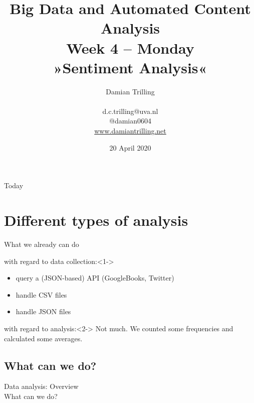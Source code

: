 \documentclass{beamer}
\begin{document}
\title[Big Data and Automated Content Analysis]{\textbf{Big Data and Automated Content Analysis} \\ Week 4 -- Monday \\ »Sentiment Analysis«}
\author[Damian Trilling]{Damian Trilling \\ ~ \\ \footnotesize{d.c.trilling@uva.nl \\@damian0604} \\ \url{www.damiantrilling.net}}
\date{20 April 2020}


\begin{frame}{}
\titlepage
\end{frame}

\begin{frame}{Today}
\tableofcontents
\end{frame}



\section{Different types of analysis}

\begin{frame}{What we already can do}
\begin{block}{with regard to data collection:}<1->
\begin{itemize}
\item query a (JSON-based) API (GoogleBooks, Twitter)
\item handle CSV files
\item handle JSON files 
\end{itemize}
\end{block}

\begin{block}{with regard to analysis:}<2->
Not much. We counted some frequencies and calculated some averages.
\end{block}

\end{frame}



\subsection{What can we do?}
\begin{frame}
Data analysis: Overview\\
What can we do? \\ ~\\
\end{frame}
\end{document}
